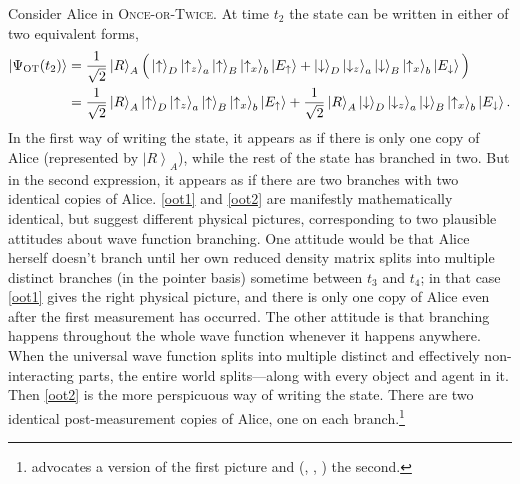 \documentclass[12pt,onecolumn,secnumarabic,amsmath,amssymb,balancelastpage,nofootinbib]{article}
\newcommand{\ket}[1]{\ensuremath{\left|#1\right\rangle}}
\begin{document}
Consider Alice in \textsc{Once-or-Twice}. At time $t_2$ the state can be written in either of two equivalent forms,
\begin{align}
\ket{\Psi_{\textsc{OT}}(t_2)}&=\frac{1}{\sqrt{2}}\ket{R}_A\Big(\ket{\uparrow}_{D}\ket{\uparrow_z}_a\ket{\uparrow}_B\ket{\uparrow_x}_b\ket{E_{\uparrow}}+\ket{\downarrow}_{D}\ket{\downarrow_z}_a\ket{\downarrow}_B\ket{\uparrow_x}_b\ket{E_{\downarrow}}\Big)
\label{oot1}
\\
&=\frac{1}{\sqrt{2}}\ket{R}_A\ket{\uparrow}_{D}\ket{\uparrow_z}_a\ket{\uparrow}_B\ket{\uparrow_x}_b\ket{E_{\uparrow}}+\frac{1}{\sqrt{2}}\ket{R}_A\ket{\downarrow}_{D}\ket{\downarrow_z}_a\ket{\downarrow}_B\ket{\uparrow_x}_b\ket{E_{\downarrow}}.
\label{oot2}
\end{align}
In the first way of writing the state, it appears as if there is only one copy of Alice (represented by $\ket{R}_A$), while the rest of the state has branched in two. But in the second expression, it appears as if there are two branches with two identical copies of Alice. \eqref{oot1} and \eqref{oot2} are manifestly mathematically identical, but suggest different physical pictures, corresponding to two plausible attitudes about wave function branching. One attitude would be that Alice herself doesn't branch until her own reduced density matrix splits into multiple distinct branches (in the pointer basis) sometime between $t_3$ and $t_4$; in that case \eqref{oot1} gives the right physical picture, and there is only one copy of Alice even after the first measurement has occurred. The other attitude is that branching happens throughout the whole wave function whenever it happens anywhere.  When the universal wave function splits into multiple distinct and effectively non-interacting parts, the entire world splits---along with every object and agent in it. Then \eqref{oot2} is the more perspicuous way of writing the state.  There are two identical post-measurement copies of Alice, one on each branch.\footnote{\citet[]{wallace2012} advocates a version of the first picture and \citeauthor{vaidman2014} (\citeyear{vaidman2014}, \citeyear{vaidmanSEP}, \citeyear{vaidman2015}) the second.}
\end{document}
